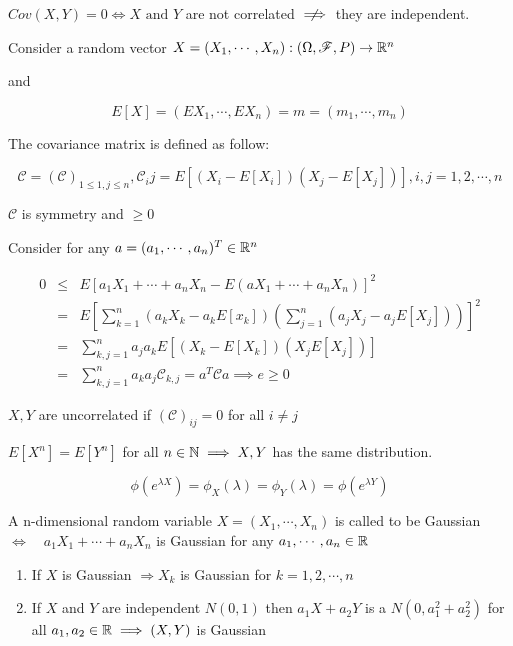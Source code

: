 \begin{rmk*}
	$Cov(X,Y) = 0 \Leftrightarrow X \text{ and } Y$ are not correlated $\centernot\implies$ they are independent.
\end{rmk*}

Consider a random vector $X = (X_1,\cdots,X_n):(\Omega,\mathscr{F},P) \rightarrow \mathbb{R}^n$

and

$$E[X] = (EX_1,\cdots,EX_n) = m = (m_1,\cdots,m_n)$$

The covariance matrix is defined as follow:

$$\mathscr{C} = (\mathscr{C})_{1 \leq 1,j \leq n}, \mathscr{C}_ij = E[(X_i - E[X_i])(X_j - E[X_j])], i,j = 1,2,\cdots,n$$

\begin{prop*}
	$\mathscr{C}$ is symmetry and $\geq 0$
	
	Consider for any $a = (a_1,\cdots,a_n)^T \in \mathbb{R}^n$
	
	\begin{eqnarray*}
		0 &\leq & E[a_1X_1 + \cdots + a_nX_n - E(aX_1 + \cdots + a_nX_n)]^2 \\
		&=& E[\sum^n_{k = 1}(a_kX_k - a_kE[x_k])(\sum^n_{j=1}(a_jX_j - a_j E[X_j]))]^2 \\
		&=& \sum^n_{k,j = 1}a_ja_kE[(X_k - E[X_k])(X_jE[X_j])] \\
		&=& \sum^n_{k,j=1}a_ka_j\mathscr{C}_{k,j} = a^T\mathscr{C}a \implies e \geq 0
	\end{eqnarray*}
\end{prop*}

\begin{defn} $X,Y$ are uncorrelated if $(\mathscr{C})_{ij} = 0$ for all $i \neq j$

\end{defn}

\begin{prop*}
	$E[X^n] = E[Y^n]$ for all $n \in \mathbb{N} \implies X,Y$ has the same distribution.
	
	$$\phi(e^{\lambda X}) = \phi_X(\lambda) = \phi_Y(\lambda) = \phi(e^{\lambda Y})$$
\end{prop*}

\begin{defn}
	A n-dimensional random variable $X = (X_1,\cdots,X_n)$ is called to be Gaussian $\Leftrightarrow \quad a_1X_1 + \cdots + a_nX_n$ is Gaussian for any $a_1,\cdots,a_n \in \mathbb{R}$
\end{defn}

\begin{rmk*}
\begin{enumerate}
	\item If $X$ is Gaussian $\Rightarrow X_k$ is Gaussian for $k = 1,2,\cdots,n$
	\item If $X$ and $Y$ are independent $N(0,1)$ then $a_1X + a_2Y$ is a $N(0,a_1^2 + a_2^2)$ for all $a_1,a_2 \in \mathbb{R} \implies (X,Y)$ is Gaussian
\end{enumerate}
\end{rmk*}

